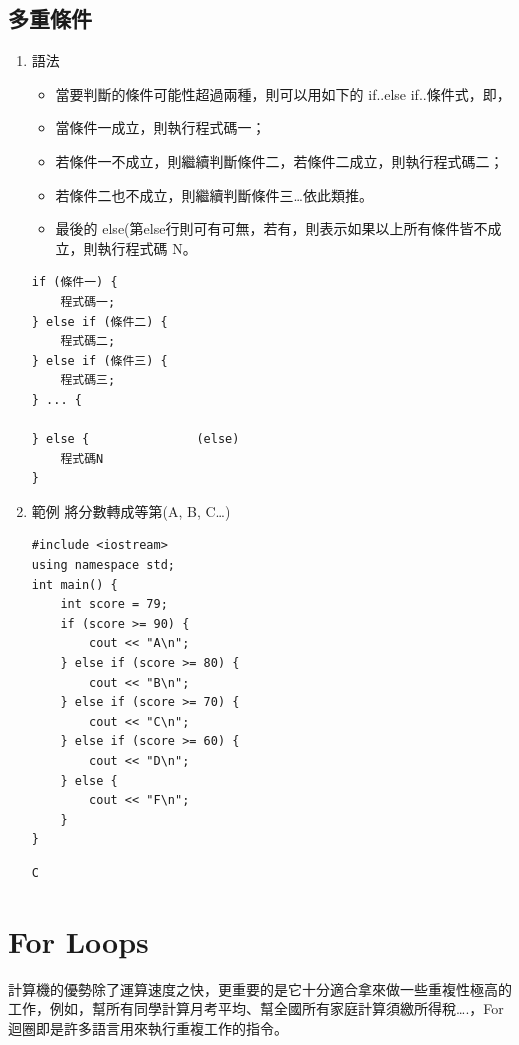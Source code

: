 \documentclass[a4paper,12pt]{article}
\begin{document}
\subsection{多重條件}
\label{cpp_multi_conditions}
\begin{enumerate}
\item 語法
\label{sec:org9076e44}
\begin{itemize}
\item 當要判斷的條件可能性超過兩種，則可以用如下的 if..else if..條件式，即，\\
\item 當條件一成立，則執行程式碼一；\\
\item 若條件一不成立，則繼續判斷條件二，若條件二成立，則執行程式碼二；\\
\item 若條件二也不成立，則繼續判斷條件三\ldots{}依此類推。\\
\item 最後的 else(第else行則可有可無，若有，則表示如果以上所有條件皆不成立，則執行程式碼 N。\\
\end{itemize}
\lstset{breaklines=true,language=cpp,label= ,caption= ,captionpos=b,numbers=none}
\begin{lstlisting}
if (條件一) {
    程式碼一;
} else if (條件二) {
    程式碼二;
} else if (條件三) {
    程式碼三;
} ... {

} else {               (else)
    程式碼N
}
\end{lstlisting}
\item 範例
\label{sec:org474bbe9}
將分數轉成等第(A, B, C\ldots{})\\
\lstset{breaklines=true,language=cpp,label= ,caption= ,captionpos=b,firstnumber=1,numbers=left}
\begin{lstlisting}
#include <iostream>
using namespace std;
int main() {
    int score = 79;
    if (score >= 90) {
        cout << "A\n";
    } else if (score >= 80) {
        cout << "B\n";
    } else if (score >= 70) {
        cout << "C\n";
    } else if (score >= 60) {
        cout << "D\n";
    } else {
        cout << "F\n";
    }
}
\end{lstlisting}

\begin{verbatim}
C
\end{verbatim}
\end{enumerate}

\section{For Loops}
\label{cpp_for_loop}
計算機的優勢除了運算速度之快，更重要的是它十分適合拿來做一些重複性極高的工作，例如，幫所有同學計算月考平均、幫全國所有家庭計算須繳所得稅\ldots{}.，For 迴圈即是許多語言用來執行重複工作的指令。\\
\end{document}
